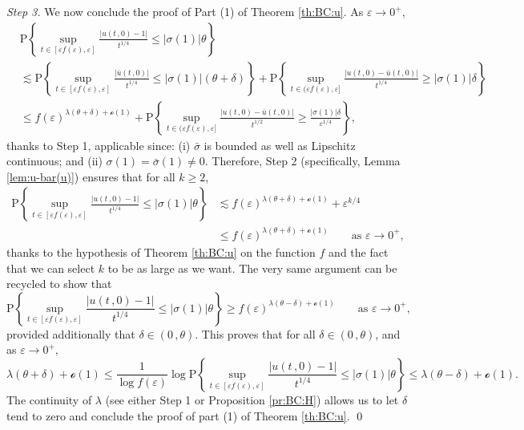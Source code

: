 \documentclass[reqno]{amsart}
\newcommand{\<}{\langle}
\renewcommand{\>}{\rangle}
\renewcommand{\P}{\mathrm{P}}
\newcommand{\1}{\mathbb{1}}
\renewcommand{\ge}{\geqslant}
\renewcommand{\le}{\leqslant}
\theoremstyle{definition}
\numberwithin{equation}{section}
\begin{document}
\noindent\emph{Step 3.}
We now conclude the proof of Part (1) of
Theorem \ref{th:BC:u}. As $\varepsilon\to0^+$,
\begin{align*}
	&\P\left\{ \sup_{t \in [\varepsilon f(\varepsilon),\varepsilon]} 
		\frac{|u(t\,,0)-1|}{t^{1/4}} \le |\sigma(1)|\theta \right\}\\
	&\lesssim \P\left\{ \sup_{t \in [\varepsilon f(\varepsilon),\varepsilon]}
		\frac{|\bar{u}(t\,,0)|}{t^{1/4}} \le  |\sigma(1)| (\theta + \delta) \right\}
		+\P\left\{ \sup_{t\in(\varepsilon f(\varepsilon),\varepsilon]} 
		\frac{|u(t\,,0) - \bar{u} (t\,,0)|}{t^{1/4}}\ge  |\sigma(1)|\delta \right\}\\
	&\le f(\varepsilon)^{\lambda(\theta+\delta)+\mathscr{o}(1)}
		+\P\left\{ \sup_{t\in(\varepsilon f(\varepsilon),\varepsilon]} 
		\frac{|u(t\,,0) - \bar{u} (t\,,0)|}{t^{1/2}}\ge
		\frac{ |\sigma(1)|\delta}{\varepsilon^{1/4}} \right\},
\end{align*}
thanks to Step 1, applicable since: (i)
$\bar\sigma$ is bounded as well as Lipschitz continuous; and
(ii) $\sigma(1)=\bar{\sigma}(1)\neq0$.
Therefore, Step 2 (specifically, Lemma \ref{lem:u-bar(u)}) ensures that for all $k\ge2$,
\begin{align*}
	\P\left\{ \sup_{t \in [\varepsilon f(\varepsilon),\varepsilon]} 
		\frac{|u(t\,,0)-1|}{t^{1/4}} \le |\sigma(1)|\theta \right\}
		&\lesssim f(\varepsilon)^{\lambda(\theta+\delta)+\mathscr{o}(1)}
		+\varepsilon^{k/4}\\
	&\le f(\varepsilon)^{\lambda(\theta+\delta)+\mathscr{o}(1)}
	\qquad\text{as $\varepsilon\to0^+$},
\end{align*}
thanks to the hypothesis of Theorem \ref{th:BC:u}
on the function $f$ and the fact that we can select $k$ to be as large as we want.
The very same argument can be recycled to show that
\[
	\P\left\{ \sup_{t \in [\varepsilon f(\varepsilon),\varepsilon]} 
	\frac{|u(t\,,0)-1|}{t^{1/4}} \le |\sigma(1)|\theta \right\}
	\ge f(\varepsilon)^{\lambda(\theta-\delta)+\mathscr{o}(1)}
	\qquad\text{as $\varepsilon\to0^+$},
\]
provided additionally that $\delta\in(0\,,\theta)$. This proves that
for all $\delta\in(0\,,\theta)$, and
as $\varepsilon\to0^+$,
\[
	\lambda(\theta+\delta)+\mathscr{o}(1)\le
	\frac{1}{\log f(\varepsilon)}
	\log\P\left\{ \sup_{t \in [\varepsilon f(\varepsilon),\varepsilon]} 
	\frac{|u(t\,,0)-1|}{t^{1/4}} \le |\sigma(1)|\theta \right\} \le
	\lambda(\theta-\delta)+\mathscr{o}(1).
\]
The continuity of $\lambda$ (see either Step 1 or Proposition \ref{pr:BC:H})
allows us to let $\delta$ tend to zero and
conclude the proof of part (1) of Theorem \ref{th:BC:u}.
\qed
\end{document}
